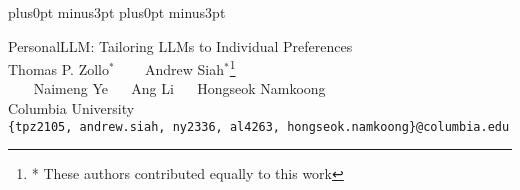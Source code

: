 \documentclass[11pt]{article}
\begin{document}
\abovedisplayskip=8pt plus0pt minus3pt
\belowdisplayskip=8pt plus0pt minus3pt



\begin{center}
  {\huge PersonalLLM: Tailoring LLMs to Individual Preferences } \\
  \vspace{.5cm} {\Large Thomas P. Zollo$^*$ ~~~ Andrew Siah$^*$}\footnote{* These authors contributed equally to this work}\\
  
  \vspace{.2cm}
  {\Large ~~~ Naimeng Ye ~~ Ang Li ~~ Hongseok Namkoong} \\
  \vspace{.2cm}
  {\large Columbia University} \\
  \vspace{.2cm}
  \texttt{\{tpz2105, andrew.siah, ny2336, al4263, hongseok.namkoong\}@columbia.edu}
\end{center}
















\newpage



\newpage
\begin{appendix}

\end{appendix}
\end{document}
